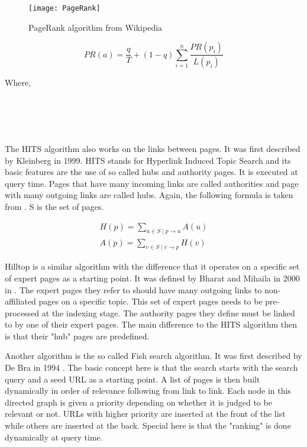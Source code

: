 \begin{figure}[!htb] %
  \centering
  \texttt{[image: PageRank]}
\caption[PageRank algorithm]{PageRank algorithm from Wikipedia}
\label{fig:pagerank}
\end{figure}

\begin{equation}
  PR(a) =
  \frac{q}{T} + (1 - q)
  \sum_{i=1}^{n} \frac{PR(p_i)}{L(p_i)}
\end{equation}

Where,\\
 \\
 \\
 \\
 \\
\itab{} 

The HITS algorithm also works on the links between pages. It was first described by Kleinberg \citep[p.472]{Kleinberg1999, Kleinberg} in 1999. HITS stands for Hyperlink Induced Topic Search and its basic features are the use of so called hubs and authority pages. It is executed at query time. Pages that have many incoming links are called authorities and page with many outgoing links are called hubs. Again, the following formula is taken from \citep[p.471]{Baeza-Yates2011}. S is the set of pages.

\begin{align}
  H(p) = \sum_{u\in S \mid p\to u}A(u)\\
  A(p) = \sum_{v\in S \mid v\to p}H(v)
\end{align}

Hilltop is a similar algorithm with the difference that it operates on a specific set of expert pages as a starting point. It was defined by Bharat and Mihaila in 2000 in \citep{Bharat2000}. The expert pages they refer to should have many outgoing links to non-affiliated pages on a specific topic. This set of expert pages needs to be pre-processed at the indexing stage. The authority pages they define must be linked to by one of their expert pages. The main difference to the HITS algorithm then is that their "hub" pages are predefined.

Another algorithm is the so called Fish search algorithm. It was first described by De Bra in 1994 \citep{Debra1994, Debra1994a, Debra}. The basic concept here is that the search starts with the search query and a seed URL as a starting point. A list of pages is then built dynamically in order of relevance following from link to link. Each node in this directed graph is given a priority depending on whether it is judged to be relevant or not. URLs with higher priority are inserted at the front of the list while others are inserted at the back. Special here is that the "ranking" is done dynamically at query time.

